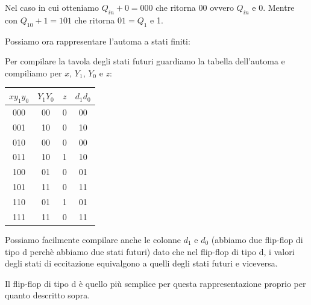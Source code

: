 \begin{exercise}
    Nel caso in cui otteniamo $Q_{in}+0=000$ che ritorna $00$ ovvero $Q_{in}$ e 0. Mentre con $Q_{10}+1=101$ che ritorna $01=Q_1$ e 1.
    
    Possiamo ora rappresentare l'automa a stati finiti:
    
    
    Per compilare la tavola degli stati futuri guardiamo la tabella dell'automa e compiliamo per $x$, $Y_1$, $Y_0$ e $z$:
    \begin{table}[ht]
    \centering
    \begin{tabular}{|c|c|c|c|}
         \hline $xy_1y_0$ & $Y_1Y_0$ & $z$ & $d_1d_0$\\\hline\hline
         000 & 00 & 0 & 00\\
         001 & 10 & 0 & 10\\
         010 & 00 & 0 & 00\\
         011 & 10 & 1 & 10\\\hline
         100 & 01 & 0 & 01\\
         101 & 11 & 0 & 11\\
         110 & 01 & 1 & 01\\
         111 & 11 & 0 & 11\\\hline
    \end{tabular}
\end{table}

Possiamo facilmente compilare anche le colonne $d_1$ e $d_0$ (abbiamo due flip-flop di tipo d perchè abbiamo due stati futuri) dato che nel flip-flop di tipo d, i valori degli stati di eccitazione equivalgono a quelli degli stati futuri e viceversa.
\begin{osservation}
    Il flip-flop di tipo d è quello più semplice per questa rappresentazione proprio per quanto descritto sopra.
\end{osservation}


\end{exercise}
